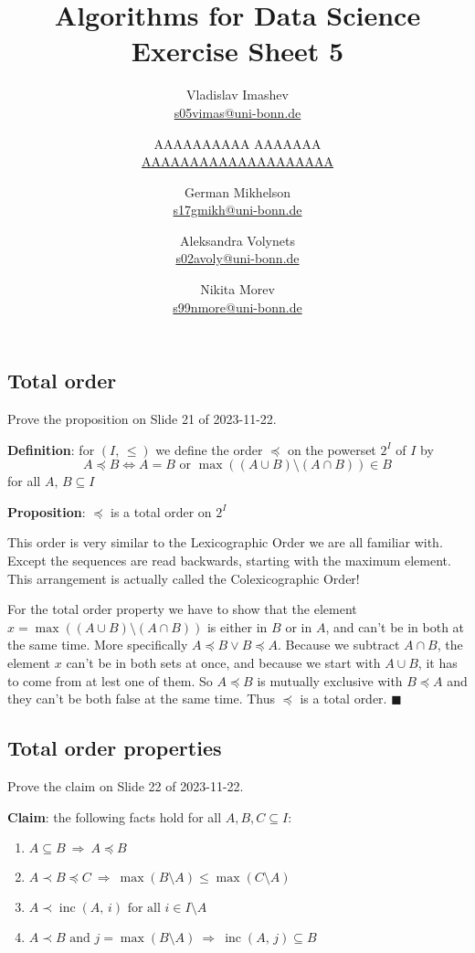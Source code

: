\documentclass{article}
\title{Algorithms for Data Science \\ Exercise Sheet 5}
\author{
  Vladislav Imashev \\ \href{mailto:s05vimas@uni-bonn.de}{s05vimas@uni-bonn.de} \and
  AAAAAAAAAA AAAAAAA \\ \href{mailto:AAAAAAAAAAAAAAAAAAAA}{AAAAAAAAAAAAAAAAAAAA} \and
  German Mikhelson \\ \href{mailto:s17gmikh@uni-bonn.de}{s17gmikh@uni-bonn.de} \and
  Aleksandra Volynets \\ \href{mailto:s02avoly@uni-bonn.de}{s02avoly@uni-bonn.de} \and
  Nikita Morev \\ \href{mailto:s99nmore@uni-bonn.de}{s99nmore@uni-bonn.de}
}
\newcommand{\inc}{\operatorname{inc}}
\begin{document}
  \maketitle

  \setcounter{section}{5}
  \subsection{Total order}
  \begin{centerframebox}
    Prove the proposition on Slide 21 of 2023-11-22.

    \textbf{Definition}: for $(I,\, \leq)$ we define the order $\preceq$ on the powerset $2^I$ of $I$ by
    \[ A \preceq B \iff A=B \textrm{ or } \max((A\cup B)\setminus(A\cap B))\in B \]
    for all $A,\, B \subseteq I$

    \textbf{Proposition}: $\preceq$ is a total order on $2^I$
  \end{centerframebox}
  This order is very similar to the Lexicographic Order we are all familiar with.
  Except the sequences are read backwards, starting with the maximum element.
  This arrangement is actually called the Colexicographic Order!

  For the total order property we have to show that the element $x = \max((A\cup B)\setminus(A\cap B))$
  is either in $B$ or in $A$, and can't be in both at the same time.
  More specifically $A \preceq B \lor B \preceq A$.
  Because we subtract $A\cap B$, the element $x$ can't be in both sets at once,
  and because we start with $A\cup B$, it has to come from at lest one of them.
  So $A \preceq B$ is mutually exclusive with $B \preceq A$ and they can't be both false at the same time.
  Thus $\preceq$ is a total order.
  $\blacksquare$

  \subsection{Total order properties}
  \begin{centerframebox}
    Prove the claim on Slide 22 of 2023-11-22.

    \textbf{Claim}: the following facts hold for all $A,B,C \subseteq I$:
    \begin{enumerate}[label=(\roman*)]
      \item $A \subseteq B ~\Longrightarrow~ A \preceq B$
      \item $A \prec B \preceq C ~\Longrightarrow~ \max(B \setminus A) \leq \max(C \setminus A)$
      \item $A \prec \inc(A,\, i) \textrm{ for all } i \in I \setminus A$
      \item $A \prec B \textrm{ and } j = \max(B \setminus A) ~\Longrightarrow~ \inc(A,\, j) \subseteq B$
    \end{enumerate}
  \end{centerframebox}
\end{document}
